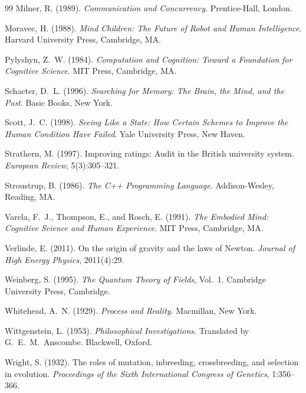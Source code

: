\documentclass[12pt, a4paper]{article}
\theoremstyle{plain}
\theoremstyle{definition}
\theoremstyle{remark}
\begin{document}
\begin{thebibliography}{99}
Milner, R. (1989). \textit{Communication and Concurrency}. Prentice-Hall,
London.

Moravec, H. (1988). \textit{Mind Children: The Future of Robot and Human
Intelligence}. Harvard University Press, Cambridge, MA.

Pylyshyn, Z.~W. (1984). \textit{Computation and Cognition: Toward a Foundation
for Cognitive Science}. MIT Press, Cambridge, MA.

Schacter, D.~L. (1996). \textit{Searching for Memory: The Brain, the Mind,
and the Past}. Basic Books, New York.

Scott, J.~C. (1998). \textit{Seeing Like a State: How Certain Schemes to
Improve the Human Condition Have Failed}. Yale University Press, New Haven.

Strathern, M. (1997). Improving ratings: Audit in the British university
system. \textit{European Review}, 5(3):305--321.

Stroustrup, B. (1986). \textit{The C++ Programming Language}.
Addison-Wesley, Reading, MA.

Varela, F.~J., Thompson, E., and Rosch, E. (1991). \textit{The Embodied Mind:
Cognitive Science and Human Experience}. MIT Press, Cambridge, MA.

Verlinde, E. (2011). On the origin of gravity and the laws of Newton.
\textit{Journal of High Energy Physics}, 2011(4):29.

Weinberg, S. (1995). \textit{The Quantum Theory of Fields}, Vol.~1.
Cambridge University Press, Cambridge.

Whitehead, A.~N. (1929). \textit{Process and Reality}. Macmillan, New York.

Wittgenstein, L. (1953). \textit{Philosophical Investigations}. Translated
by G.~E.~M.\ Anscombe. Blackwell, Oxford.

Wright, S. (1932). The roles of mutation, inbreeding, crossbreeding, and
selection in evolution. \textit{Proceedings of the Sixth International
Congress of Genetics}, 1:356--366.


\end{thebibliography}
\end{document}
